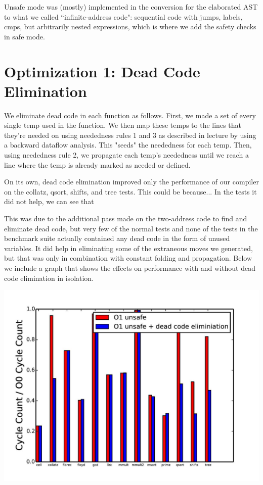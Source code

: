 \documentclass{article}
\begin{document}
Unsafe mode was (mostly) implemented in the conversion for the elaborated AST to what we called ``infinite-address code": sequential code with jumps, labels, cmps, but arbitrarily nested expressions, which is where we add the safety checks in safe mode.

\section{Optimization 1: Dead Code Elimination}

We eliminate dead code in each function as follows. First, we made a set of every single temp used in the function. We then map these temps to the lines that they're needed on using neededness rules 1 and 3 as described in lecture by using a backward dataflow analysis. This "seeds" the neededness for each temp. Then, using neededness rule 2, we propagate each temp's neededness until we reach a line where the temp is already marked as needed or defined. 

On its own, dead code elimination improved only the performance of our compiler on the collatz, qsort, shifts, and tree tests. This could be because... In the tests it did not help, we can see that 

This was due to the additional pass made on the two-address code to find and eliminate dead code, but very few of the normal tests and none of the tests in the benchmark suite actually contained any dead code in the form of unused variables. It did help in eliminating some of the extraneous moves we generated, but that was only in combination with constant folding and propagation. Below we include a graph that shows the effects on performance with and without dead code elimination in isolation.

\includegraphics[scale=0.5]{O1_vs_deadcode-page-001}
\end{document}
